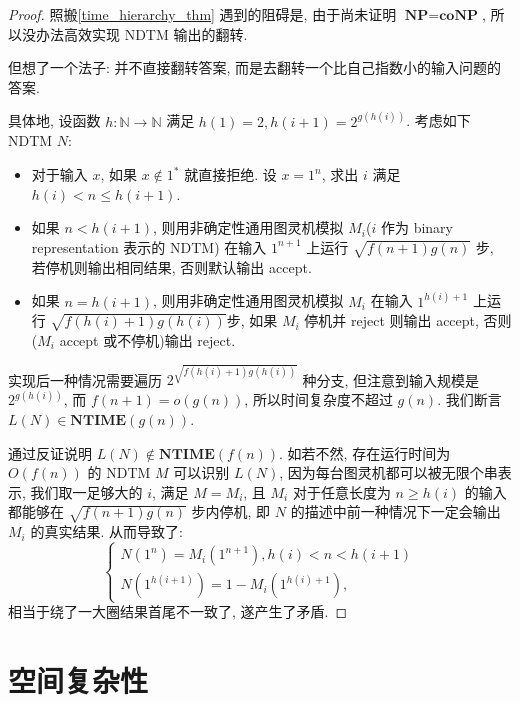 \documentclass[8pt]{article}
\theoremstyle{compact}
\def\le{\leqslant}
\def\ge{\geqslant}
\def\NTIME{\textbf{NTIME}}
\def\NP{\textbf{NP}}
\def\coNP{\textbf{coNP}}
\begin{document}
\begin{proof}
	照搬\cref{time_hierarchy_thm} 遇到的阻碍是, 由于尚未证明 $\NP = \coNP$, 所以没办法高效实现 NDTM 输出的翻转.

	但想了一个法子: 并不直接翻转答案, 而是去翻转一个比自己指数小的输入问题的答案.

	具体地, 设函数 $h: \mathbb N \to \mathbb N$ 满足 $h(1) = 2, h(i + 1) = 2^{g(h(i))}$. 考虑如下 NDTM $N$:
	\begin{itemize}
		\item 对于输入 $x$, 如果 $x \notin 1^*$ 就直接拒绝. 设 $x = 1^n$, 求出 $i$ 满足 $h(i) < n \le h(i + 1)$.
		\item 如果 $n < h(i + 1)$, 则用非确定性通用图灵机模拟 $M_i$($i$ 作为 binary representation 表示的 NDTM) 在输入 $1^{n+1}$ 上运行 $\sqrt{f(n+1)g(n)}$ 步, 若停机则输出相同结果, 否则默认输出 accept.
		\item 如果 $n = h(i + 1)$, 则用非确定性通用图灵机模拟 $M_i$ 在输入 $1^{h(i) + 1}$ 上运行 $\sqrt{f(h(i)+1)g(h(i))}$步, 如果 $M_i$ 停机并 reject 则输出 accept, 否则($M_i$ accept 或不停机)输出 reject.
	\end{itemize}

	实现后一种情况需要遍历 $2^{\sqrt{f(h(i)+1)g(h(i))}}$ 种分支, 但注意到输入规模是 $2^{g(h(i))}$, 而 $f(n+1) = o(g(n))$, 所以时间复杂度不超过 $g(n)$. 我们断言 $L(N) \in \NTIME(g(n))$.

	通过反证说明 $L(N) \notin \NTIME(f(n))$. 如若不然, 存在运行时间为 $O(f(n))$ 的 NDTM $M$ 可以识别 $L(N)$, 因为每台图灵机都可以被无限个串表示, 我们取一足够大的 $i$, 满足 $M = M_i$, 且 $M_i$ 对于任意长度为 $n \ge h(i)$ 的输入都能够在 $\sqrt{f(n+1)g(n)}$ 步内停机, 即 $N$ 的描述中前一种情况下一定会输出 $M_i$ 的真实结果. 从而导致了: $$\begin{cases}
		N(1^n) = M_i(1^{n+1}),  h(i) < n < h(i + 1) \\
		N(1^{h(i + 1)}) = 1 - M_i(1^{h(i) + 1}), 
	\end{cases}$$ 相当于绕了一大圈结果首尾不一致了, 遂产生了矛盾.


\end{proof}

\newpage
\section{空间复杂性}
\end{document}
